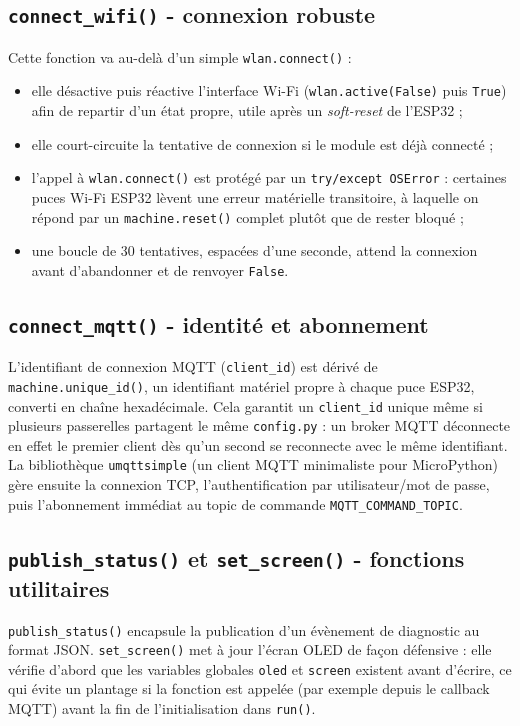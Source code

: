 \documentclass[a4paper,11pt]{report}
\begin{document}
\subsection{\texttt{connect\_wifi()} - connexion robuste}
Cette fonction va au-delà d'un simple \texttt{wlan.connect()} :
\begin{itemize}
    \item elle désactive puis réactive l'interface Wi-Fi (\texttt{wlan.active(False)} puis
    \texttt{True}) afin de repartir d'un état propre, utile après un \emph{soft-reset} de l'ESP32 ;
    \item elle court-circuite la tentative de connexion si le module est déjà connecté ;
    \item l'appel à \texttt{wlan.connect()} est protégé par un \texttt{try/except OSError} : certaines
    puces Wi-Fi ESP32 lèvent une erreur matérielle transitoire, à laquelle on répond par un
    \texttt{machine.reset()} complet plutôt que de rester bloqué ;
    \item une boucle de 30 tentatives, espacées d'une seconde, attend la connexion avant d'abandonner et
    de renvoyer \texttt{False}.
\end{itemize}

\subsection{\texttt{connect\_mqtt()} - identité et abonnement}
L'identifiant de connexion MQTT (\texttt{client\_id}) est dérivé de \texttt{machine.unique\_id()}, un
identifiant matériel propre à chaque puce ESP32, converti en chaîne hexadécimale. Cela garantit un
\texttt{client\_id} unique même si plusieurs passerelles partagent le même \texttt{config.py} : un broker
MQTT déconnecte en effet le premier client dès qu'un second se reconnecte avec le même identifiant.
La bibliothèque \texttt{umqttsimple} (un client MQTT minimaliste pour MicroPython) gère ensuite la
connexion TCP, l'authentification par utilisateur/mot de passe, puis l'abonnement immédiat au topic de
commande \texttt{MQTT\_COMMAND\_TOPIC}.

\subsection{\texttt{publish\_status()} et \texttt{set\_screen()} - fonctions utilitaires}
\texttt{publish\_status()} encapsule la publication d'un évènement de diagnostic au format JSON.
\texttt{set\_screen()} met à jour l'écran OLED de façon défensive : elle vérifie d'abord que les variables
globales \texttt{oled} et \texttt{screen} existent avant d'écrire, ce qui évite un plantage si la fonction
est appelée (par exemple depuis le callback MQTT) avant la fin de l'initialisation dans \texttt{run()}.
\end{document}
